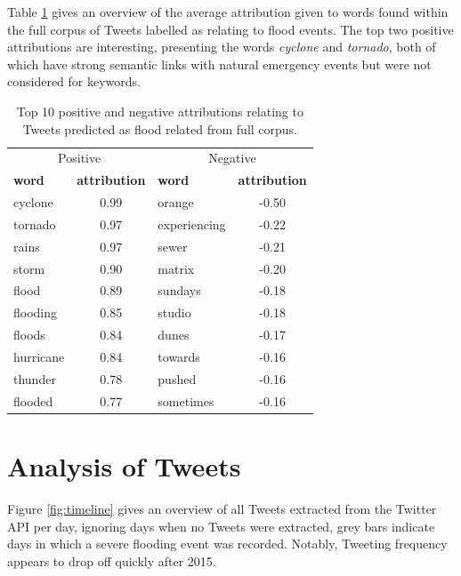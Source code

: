 \documentclass[a4paper, notitlepage]{extreport}
\begin{document}
Table \ref{tab:attributions} gives an overview of the average
attribution given to words found within the full corpus of Tweets
labelled as relating to flood events. The top two positive attributions
are interesting, presenting the words \emph{cyclone} and \emph{tornado},
both of which have strong semantic links with natural emergency events
but were not considered for keywords.

\begin{table}

\caption{\label{tab:attributions}Top 10 positive and negative attributions relating to Tweets predicted as flood related from full corpus.}
\centering
\fontsize{9}{11}\selectfont
\begin{tabular}[t]{lclc}
\toprule
\multicolumn{2}{c}{Positive} & \multicolumn{2}{c}{Negative} \\
\cmidrule(l{3pt}r{3pt}){1-2} \cmidrule(l{3pt}r{3pt}){3-4}
\textbf{word} & \textbf{attribution} & \textbf{word} & \textbf{attribution}\\
\midrule
cyclone & 0.99 & orange & -0.50\\
tornado & 0.97 & experiencing & -0.22\\
rains & 0.97 & sewer & -0.21\\
storm & 0.90 & matrix & -0.20\\
flood & 0.89 & sundays & -0.18\\
flooding & 0.85 & studio & -0.18\\
floods & 0.84 & dunes & -0.17\\
hurricane & 0.84 & towards & -0.16\\
thunder & 0.78 & pushed & -0.16\\
flooded & 0.77 & sometimes & -0.16\\
\bottomrule
\end{tabular}
\end{table}

\hypertarget{analysis-of-tweets}{%
\section{Analysis of Tweets}\label{analysis-of-tweets}}

Figure \ref{fig:timeline} gives an overview of all Tweets extracted from
the Twitter API per day, ignoring days when no Tweets were extracted,
grey bars indicate days in which a severe flooding event was recorded.
Notably, Tweeting frequency appears to drop off quickly after 2015.
\end{document}
